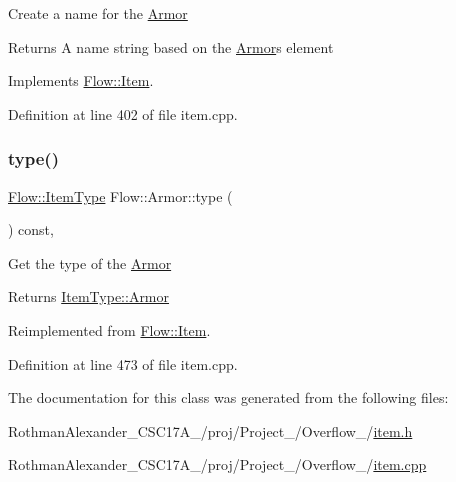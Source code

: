 Create a name for the \hyperlink{class_flow_1_1_armor}{Armor} \begin{DoxyReturn}{Returns}
A name string based on the \hyperlink{class_flow_1_1_armor}{Armor}\textquotesingle{}s element 
\end{DoxyReturn}


Implements \hyperlink{class_flow_1_1_item_a775605940d8a063e7cf5c7d87820d4d1}{Flow\+::\+Item}.



Definition at line 402 of file item.\+cpp.

\hypertarget{class_flow_1_1_armor_af1c230e1f7f497caf6bcb86ccf67329d}{}\label{class_flow_1_1_armor_af1c230e1f7f497caf6bcb86ccf67329d} 
\subsubsection{\texorpdfstring{type()}{type()}}
{\footnotesize\ttfamily \hyperlink{namespace_flow_a09368c0b65b3d1bc5c227ed1046c8bca}{Flow\+::\+Item\+Type} Flow\+::\+Armor\+::type (\begin{DoxyParamCaption}{ }\end{DoxyParamCaption}) const\hspace{0.3cm}{\ttfamily [override]}, {\ttfamily [virtual]}}

Get the type of the \hyperlink{class_flow_1_1_armor}{Armor} \begin{DoxyReturn}{Returns}
\hyperlink{namespace_flow_a09368c0b65b3d1bc5c227ed1046c8bcaac77a8030f463c2c14aebd6452fc9f0a8}{Item\+Type\+::\+Armor} 
\end{DoxyReturn}


Reimplemented from \hyperlink{class_flow_1_1_item_ae0c7ea7506ef62f2204837131f021f55}{Flow\+::\+Item}.



Definition at line 473 of file item.\+cpp.



The documentation for this class was generated from the following files\+:\begin{DoxyCompactItemize}
\item 
Rothman\+Alexander\+\_\+\+C\+S\+C17\+A\+\_/proj/\+Project\+\_/\+Overflow\+\_/\hyperlink{item_8h}{item.\+h}\item 
Rothman\+Alexander\+\_\+\+C\+S\+C17\+A\+\_/proj/\+Project\+\_/\+Overflow\+\_/\hyperlink{item_8cpp}{item.\+cpp}\end{DoxyCompactItemize}
